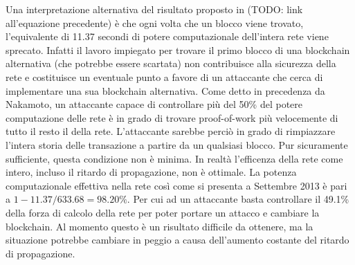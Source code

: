 Una interpretazione alternativa del risultato proposto in (TODO: link
all'equazione precedente) è che ogni volta che un blocco viene trovato,
l'equivalente di 11.37 secondi di potere computazionale dell'intera rete
viene sprecato. Infatti il lavoro impiegato per trovare il primo blocco
di una blockchain alternativa (che potrebbe essere scartata) non
contribuisce alla sicurezza della rete e costituisce un eventuale punto
a favore di un attaccante che cerca di implementare una sua blockchain
alternativa. Come detto in precedenza da Nakamoto, un attaccante capace
di controllare più del 50\% del potere computazione delle rete è in
grado di trovare proof-of-work più velocemente di tutto il resto il
della rete. L'attaccante sarebbe perciò in grado di rimpiazzare l'intera
storia delle transazione a partire da un qualsiasi blocco. Pur
sicuramente sufficiente, questa condizione non è minima. In realtà
l'efficenza della rete come intero, incluso il ritardo di propagazione,
non è ottimale. La potenza computazionale effettiva nella rete così come
si presenta a Settembre 2013 è pari a $1 - 11.37 / 633.68 = 98.20\%$.
Per cui ad un attaccante basta controllare il 49.1\% della forza di
calcolo della rete per poter portare un attacco e cambiare la
blockchain. Al momento questo è un risultato difficile da ottenere, ma
la situazione potrebbe cambiare in peggio a causa dell'aumento costante
del ritardo di propagazione.
